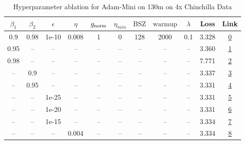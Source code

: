 \begin{table}[H]
\centering
\caption{Hyperparameter ablation for Adam-Mini on 130m on 4x Chinchilla Data}
\label{tab:ablation_adam-mini_130m_on_4x_chinchilla_data}
\begin{tabular}{ccccccccccc}
\toprule
$\beta_1$ & $\beta_2$ & $\epsilon$ & $\eta$ & $g_{\mathrm{norm}}$ & $\eta_{min}$ & $\mathrm{BSZ}$ & $\mathrm{warmup}$ & $\lambda$ & Loss & Link \\
\midrule
0.9 & 0.98 & 1e-10 & 0.008 & 1 & 0 & 128 & 2000 & 0.1 & 3.328 & \href{https://wandb.ai/marin-community/optimizer-scaling/runs/sweep-130m-10B-mini8e0689lr0.008-wd0.1-minlr0-warmup2000-b10.9-b-1de787}{0} \\
\midrule
0.95 & -- & -- & -- & -- & -- & -- & -- & -- & 3.360 & \href{https://wandb.ai/marin-community/optimizer-scaling/runs/sweep-130m-10B-mini5655falr0.008-wd0.1-minlr0-warmup2000-b10.95--7977a5}{1} \\
0.98 & -- & -- & -- & -- & -- & -- & -- & -- & 7.771 & \href{https://wandb.ai/marin-community/optimizer-scaling/runs/sweep-130m-10B-mini608e8clr0.008-wd0.1-minlr0-warmup2000-b10.98--851955}{2} \\
-- & 0.9 & -- & -- & -- & -- & -- & -- & -- & 3.337 & \href{https://wandb.ai/marin-community/optimizer-scaling/runs/sweep-130m-10B-minic61cb4lr0.008-wd0.1-minlr0-warmup2000-b10.9-b-3daee1}{3} \\
-- & 0.95 & -- & -- & -- & -- & -- & -- & -- & 3.331 & \href{https://wandb.ai/marin-community/optimizer-scaling/runs/sweep-130m-10B-minica3b57lr0.008-wd0.1-minlr0-warmup2000-b10.9-b-c56f5e}{4} \\
-- & -- & 1e-25 & -- & -- & -- & -- & -- & -- & 3.331 & \href{https://wandb.ai/marin-community/optimizer-scaling/runs/sweep-130m-10B-mini98f892lr0.008-wd0.1-minlr0-warmup2000-b10.9-b-b90941}{5} \\
-- & -- & 1e-20 & -- & -- & -- & -- & -- & -- & 3.331 & \href{https://wandb.ai/marin-community/optimizer-scaling/runs/sweep-130m-10B-mini3af704lr0.008-wd0.1-minlr0-warmup2000-b10.9-b-522688}{6} \\
-- & -- & 1e-15 & -- & -- & -- & -- & -- & -- & 3.334 & \href{https://wandb.ai/marin-community/optimizer-scaling/runs/sweep-130m-10B-mini99be6blr0.008-wd0.1-minlr0-warmup2000-b10.9-b-c9b783}{7} \\
-- & -- & -- & 0.004 & -- & -- & -- & -- & -- & 3.334 & \href{https://wandb.ai/marin-community/optimizer-scaling/runs/sweep-130m-10B-mini593d31lr0.004-wd0.1-minlr0-warmup2000-b10.9-b-17e1ff}{8} \\

\end{tabular}
\end{table}
